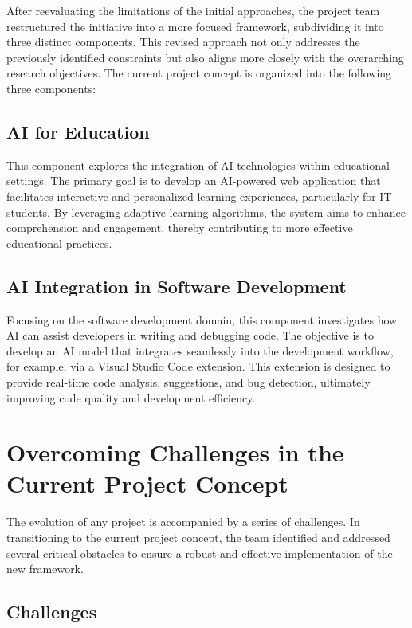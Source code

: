 After reevaluating the limitations of the initial approaches, the project team restructured the initiative into a more focused framework, subdividing it into three distinct components. This revised approach not only addresses the previously identified constraints but also aligns more closely with the overarching research objectives. The current project concept is organized into the following three components:

\subsection{AI for Education}

This component explores the integration of AI technologies within educational settings. The primary goal is to develop an AI-powered web application that facilitates interactive and personalized learning experiences, particularly for IT students. By leveraging adaptive learning algorithms, the system aims to enhance comprehension and engagement, thereby contributing to more effective educational practices.

\subsection{AI Integration in Software Development}

Focusing on the software development domain, this component investigates how AI can assist developers in writing and debugging code. The objective is to develop an AI model that integrates seamlessly into the development workflow, for example, via a Visual Studio Code extension. This extension is designed to provide real-time code analysis, suggestions, and bug detection, ultimately improving code quality and development efficiency.


\section{Overcoming Challenges in the Current Project Concept}

The evolution of any project is accompanied by a series of challenges. In transitioning to the current project concept, the team identified and addressed several critical obstacles to ensure a robust and effective implementation of the new framework.

\subsection{Challenges}

